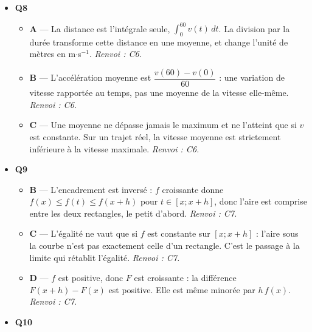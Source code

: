 \begin{itemize}
\begin{itemize}
    \item \textbf{A} — La formule d'intégration par parties retranche l'intégrale restante : $I_n=[x^ne^x]_0^1-\int_0^1 nx^{n-1}e^x\,dx=e-nI_{n-1}$. \emph{Renvoi : C5.}
    \item \textbf{B} — Les deux signes sont inversés. Le crochet $[x^ne^x]_0^1$ vaut $e$ et arrive en tête avec le signe $+$ ; l'intégrale restante est retranchée. \emph{Renvoi : C5.}
    \item \textbf{D} — La suite n'est pas constante : $I_0=e-1\approx1{,}718$ et $I_1=1$. La relation $I_1=e-1\times I_0=e-(e-1)=1$ le confirme. \emph{Renvoi : C5.}
  \end{itemize}
  \item \textbf{Q8}
  \begin{itemize}
    \item \textbf{A} — La distance est l'intégrale seule, $\int_0^{60}v(t)\,dt$. La division par la durée transforme cette distance en une moyenne, et change l'unité de mètres en m$\cdot$s$^{-1}$. \emph{Renvoi : C6.}
    \item \textbf{B} — L'accélération moyenne est $\dfrac{v(60)-v(0)}{60}$ : une variation de vitesse rapportée au temps, pas une moyenne de la vitesse elle-même. \emph{Renvoi : C6.}
    \item \textbf{C} — Une moyenne ne dépasse jamais le maximum et ne l'atteint que si $v$ est constante. Sur un trajet réel, la vitesse moyenne est strictement inférieure à la vitesse maximale. \emph{Renvoi : C6.}
  \end{itemize}
  \item \textbf{Q9}
  \begin{itemize}
    \item \textbf{B} — L'encadrement est inversé : $f$ croissante donne $f(x)\leq f(t)\leq f(x+h)$ pour $t\in[x;x+h]$, donc l'aire est comprise entre les deux rectangles, le petit d'abord. \emph{Renvoi : C7.}
    \item \textbf{C} — L'égalité ne vaut que si $f$ est constante sur $[x;x+h]$ : l'aire sous la courbe n'est pas exactement celle d'un rectangle. C'est le passage à la limite qui rétablit l'égalité. \emph{Renvoi : C7.}
    \item \textbf{D} — $f$ est positive, donc $F$ est croissante : la différence $F(x+h)-F(x)$ est positive. Elle est même minorée par $h\,f(x)$. \emph{Renvoi : C7.}
  \end{itemize}
  \item \textbf{Q10}
  \begin{itemize}

\end{itemize}
\end{itemize}
